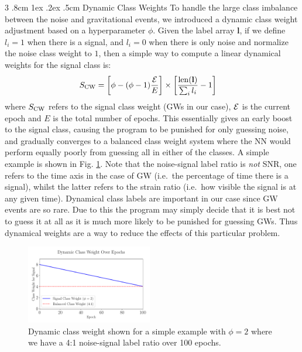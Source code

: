\documentclass[%
reprint,
amsmath,amssymb,
aps,
]{revtex4-2}
\makeatletter
\renewcommand{\subsubsection}{%
	\@startsection
	{subsubsection}%
	{3}%
	{\z@}%
	{.8cm \@plus1ex \@minus .2ex}%
	{.5cm}%
	{\normalfont\small\centering}%
}
\makeatother
\begin{document}
\subsubsection{Dynamic Class Weights}
To handle the large class imbalance between the noise and gravitational events, we introduced a dynamic class weight adjustment based on a hyperparameter $\phi$. Given the label array $\textbf{l}$, if we define $l_i=1$ when there is a signal, and $l_i=0$ when there is only noise and normalize the noise class weight to $1$, then a simple way to compute a linear dynamical weights for the signal class is:
\begin{align}
	S_{\rm CW}&=\left[\phi-(\phi-1)\frac{\varE}{E}\right]\times\left[\frac{{\rm len}(\textbf{l})}{\sum_i l_i}-1\right]
\end{align}
where $S_{\rm CW}$ refers to the signal class weight (GWs in our case), $\varE$ is the current epoch and $E$ is the total number of epochs. This essentially gives an early boost to the signal class, causing the program to be punished for only guessing noise, and gradually converges to a balanced class weight system where the NN would perform equally poorly from guessing all in either of the classes. A simple example is shown in Fig. \ref{fig:DynamicCW}. Note that the noise-signal label ratio is \textit{not} SNR, one refers to the time axis in the case of GW (i.e.~the percentage of time there is a signal), whilst the latter refers to the strain ratio (i.e.~how visible the signal is at any given time). Dynamical class labels are important in our case since GW events are so rare. Due to this the program may simply decide that it is best not to guess it at all as it is much more likely to be punished for guessing GWs. Thus dynamical weights are a way to reduce the effects of this particular problem.
\begin{figure}[ht!]
	\includegraphics[width=0.49\textwidth]{Figures/DynamicCW.pdf}
	\caption{Dynamic class weight shown for a simple example with $\phi=2$ where we have a 4:1 noise-signal label ratio over 100 epochs.}
	\label{fig:DynamicCW}
\end{figure}
\end{document}
